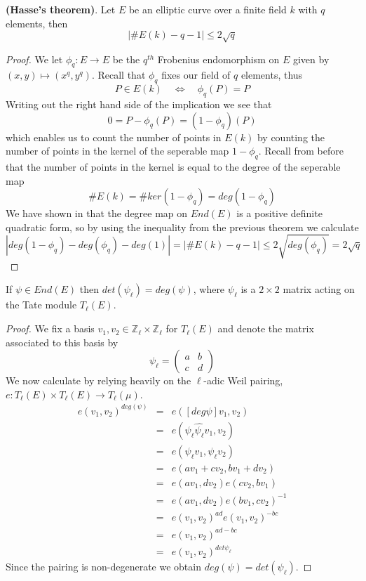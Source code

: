 \begin{thm}
 \textbf{(Hasse's theorem)}. Let $E$ be an elliptic curve over a finite field $k$ with $q$ elements, then
$$ |\#E(k) - q - 1| \leq 2\sqrt{q} $$
\end{thm}
\begin{proof}
 We let $\phi_q: E \rightarrow E$ be the $q^{th}$ Frobenius endomorphism on $E$ given by 
$(x,y) \mapsto (x^q, y^q)$. Recall that $\phi_q$ fixes our field of $q$ elements, thus
$$ P \in E(k) \quad \iff \quad \phi_q(P) = P$$
Writing out the right hand side of the implication we see that
$$ 0 = P - \phi_q(P) = (1 - \phi_q)(P) $$
which enables us to count the number of points in $E(k)$ by counting the number of points in the kernel
of the seperable map $1-\phi_q$. Recall from before that the number of points in the kernel is equal
to the degree of the seperable map
$$ \#E(k) = \# ker(1-\phi_q) = deg(1-\phi_q) $$
We have shown in that the degree map on $End(E)$ is a positive definite quadratic form, so
by using the inequality from the previous theorem we calculate
$$|deg(1-\phi_q) - deg(\phi_q) - deg(1)| = |\#E(k) - q - 1| \leq 2\sqrt{deg(\phi_q)} = 2\sqrt{q}$$
\end{proof}

\begin{prop} 
 If $\psi \in End(E)$ then $det(\psi_\ell) = deg(\psi)$, where $\psi_\ell$ is a $2\times2$ matrix acting
on the Tate module $T_\ell(E)$.
\label{detdeg}
\end{prop}
\begin{proof}
 We fix a basis $v_1,v_2 \in \mathbb{Z}_\ell \times \mathbb{Z}_\ell$ for $T_\ell(E)$ and denote the matrix
associated to this basis by
$$ \psi_\ell = \begin{pmatrix} a & b \\ c & d \end{pmatrix} $$
We now calculate by relying heavily on the $\ell$-adic Weil pairing,
$e: T_\ell(E) \times T_\ell(E) \rightarrow T_\ell(\mu)$.
\begin{eqnarray}
 e(v_1, v_2)^{deg(\psi)} &=& e([deg \psi]v_1, v_2) \nonumber \\
			 &=& e(\psi_\ell \widehat{\psi_\ell} v_1, v_2) \nonumber \\
			 &=& e(\psi_\ell v_1, \psi_\ell v_2) \nonumber \\
			 &=& e(a v_1 + c v_2, b v_1 + d v_2) \nonumber \\
			 &=& e(a v_1, d v_2) e(c v_2, b v_1) \nonumber \\
			 &=& e(a v_1, d v_2) e(b v_1, c v_2)^{-1} \nonumber \\
			 &=& e(v_1, v_2)^{ad} e(v_1, v_2)^{-bc} \nonumber \\
			 &=& e(v_1, v_2)^{ad - bc} \nonumber \\
			 &=& e(v_1, v_2)^{det \psi_\ell} \nonumber
\end{eqnarray}
Since the pairing is non-degenerate we obtain $deg(\psi) = det(\psi_\ell)$.
\end{proof}

